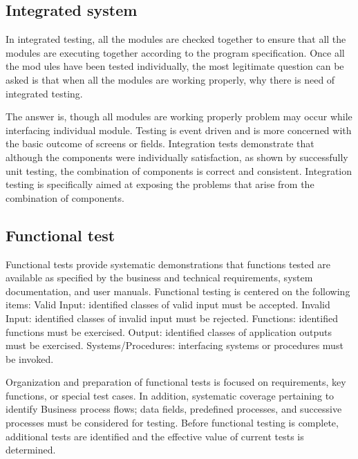 \documentclass[12pt]{report}
\begin{document}
\subsection{Integrated system}
\justifying
\setlength{\parindent}{4em}
\setlength{\parskip}{0.5em}
\renewcommand{\baselinestretch}{1.5}
\normalsize

In integrated testing, all the modules are checked together to ensure that all the modules are 
executing together according to the program specification. Once all the mod ules have been 
tested individually, the most legitimate question can be asked is that when all the modules 
are working properly, why there is need of integrated testing.

The answer is, though all modules are working properly problem may occur while interfacing 
individual module. Testing is event driven and is more concerned with the 
basic outcome of screens or fields. Integration tests demonstrate that although the components 
were individually satisfaction, as shown by successfully unit testing, the combination of 
components is correct and consistent. Integration testing is specifically aimed at exposing the 
problems that arise from the combination of components.

\subsection{ Functional test}
\justifying
\setlength{\parindent}{4em}
\setlength{\parskip}{0.5em}
\renewcommand{\baselinestretch}{1.5}
\normalsize

Functional tests provide systematic demonstrations that functions tested are available as 
specified by the business and technical requirements, system documentation, and user 
manuals. Functional testing is centered on the following items: Valid Input: identified classes 
of valid input must be accepted. Invalid Input: identified classes of invalid input must be 
rejected. Functions: identified functions must be exercised. Output: identified classes of 
application outputs must be exercised. Systems/Procedures: interfacing systems or procedures 
must be invoked.

Organization and preparation of functional tests is focused on requirements, key functions, or 
special test cases. In addition, systematic coverage pertaining to identify Business process 
flows; data fields, predefined processes, and successive processes must be considered for 
testing. Before functional testing is complete, additional tests are identified and the effective 
value of current tests is determined.
\end{document}
